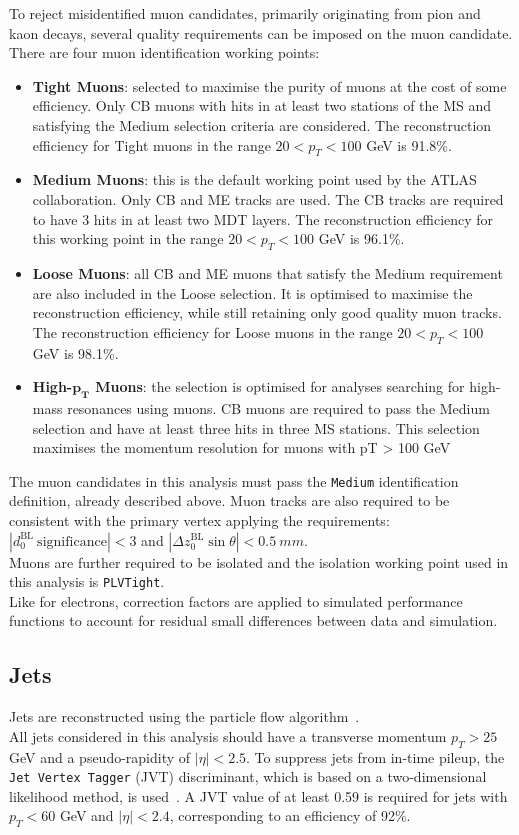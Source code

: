 To reject misidentified muon candidates, primarily originating from pion and kaon decays, several 
quality requirements can be imposed on the muon candidate.\\
There are four muon identification working points:
\begin{itemize}
	\item \textbf{Tight Muons}: selected to maximise the purity of muons
at the cost of some efficiency. Only CB muons with hits in at least two stations
of the MS and satisfying the Medium selection criteria are considered.
The reconstruction efficiency for Tight muons in the range $20 < p_T < 100$ GeV is 91.8\%.
	\item \textbf{Medium Muons}: this is the default working point used by the ATLAS collaboration.
Only CB and ME tracks are used. The CB tracks are required to have 3 hits in at
least two MDT layers. The reconstruction efficiency for this working point in
the range $20 < p_T < 100$ GeV is 96.1\%.
	\item \textbf{Loose Muons}: all CB and ME muons that satisfy the Medium requirement are also
included in the Loose selection. It is optimised to maximise the reconstruction efficiency, while 
still retaining only good quality muon tracks. The reconstruction efficiency for
Loose muons in the range $20 < p_T < 100$ GeV is 98.1\%.
	\item \textbf{High-$\bm{p_T}$ Muons}: the selection is optimised for analyses searching for
high-mass resonances using muons. CB muons are required to pass the Medium selection
and have at least three hits in three MS stations. This selection maximises the momentum
resolution for muons with pT > 100 GeV
\end{itemize}
The muon candidates in this analysis must pass the \texttt{Medium}
identification definition, already described above. Muon tracks are also required to be consistent with the primary vertex
applying the requirements: 
$|d_0^\mathrm{BL}~\mathrm{significance} | < 3$ and 
$|\Delta z_0^\mathrm{BL} \sin\theta| < \SI{0.5}{mm}$. \\
Muons are further required to be isolated and the isolation working point used in this analysis is \texttt{PLVTight}.\\
Like for electrons, correction factors are applied to simulated performance functions
to account for residual small differences between data and simulation. 

\FloatBarrier
\subsection{Jets}
\label{sec:object:jet}
Jets are reconstructed 
using the particle flow algorithm~\cite{PERF-2015-09}. \\
All jets considered in this analysis should have a transverse
momentum $p_{T} > 25$ GeV and a pseudo-rapidity of
$|\eta|\!<\!2.5$.
To suppress jets from in-time pileup, the \texttt{Jet Vertex Tagger} (JVT)
discriminant, which is based on a two-dimensional likelihood
method, is used~\cite{ATLAS-CONF-2014-018}. A JVT value of at least
0.59 is required for jets with $p_{T}< 60$ GeV
and $|\eta|\!<\!2.4$, corresponding to an efficiency of 92\%.

